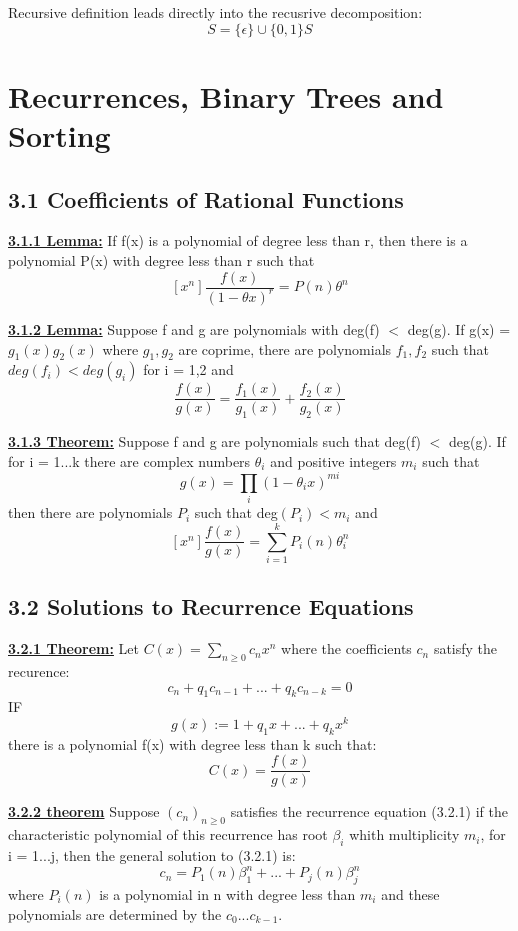 \documentclass[12pt]{article}
\newcommand{\myt}[1]{\textbf{\underline{#1}}}
\begin{document}
	Recursive definition leads directly into the recusrive decomposition:\\
	$$S = \{\epsilon\} \cup \{0,1\}S$$
	
	\section{Recurrences, Binary Trees and Sorting}
	\subsection*{3.1 Coefficients of Rational Functions}
	\myt{3.1.1 Lemma:} If f(x) is a polynomial of degree less than r, then there is a polynomial P(x) with degree less than r such that\\
	$$[x^n]\frac{f(x)}{(1-\theta x)^r} = P(n)\theta^n$$
	
	\myt{3.1.2 Lemma:} Suppose f and g are polynomials with deg(f) $<$ deg(g). If g(x) = $g_1(x)g_2(x)$ where $g_1, g_2$ are coprime, there are polynomials $f_1, f_2$ such that $deg(f_i) < deg(g_i)$ for i = 1,2 and \\
	$$\frac{f(x)}{g(x)} = \frac{f_1(x)}{g_1(x)} + \frac{f_2(x)}{g_2(x)}$$
	
	\myt{3.1.3 Theorem:} Suppose f and g are polynomials such that deg(f) $<$ deg(g). If for i = 1...k there are complex numbers $\theta_i$ and positive integers $m_i$ such that\\
	$$g(x) = \prod_{i}(1-\theta_ix)^{mi}$$
	then there are polynomials $P_i$ such that deg$(P_i) < m_i$ and \\
	$$[x^n]\frac{f(x)}{g(x)} = \sum_{i=1}^{k}P_i(n)\theta_i^n$$
	
	\subsection*{3.2 Solutions to Recurrence Equations}
	\myt{3.2.1 Theorem:} Let $C(x) = \sum_{n\geq 0}c_nx^n$ where the coefficients $c_n$ satisfy the recurence:\\
	$$c_n + q_1c_{n-1}+...+q_kc_{n-k} = 0$$
	IF
	$$g(x) := 1 + q_1x + ... + q_kx^k$$
	there is a polynomial f(x) with degree less than k such that:\\
	$$C(x) = \frac{f(x)}{g(x)}$$ 
	
	\myt{3.2.2 theorem} Suppose $(c_n)_{n\geq 0}$ satisfies the recurrence equation (3.2.1) if the characteristic polynomial of this recurrence has root $\beta_i$ whith multiplicity $m_i$, for i = 1...j, then the general solution to (3.2.1) is:\\
	$$c_n = P_1(n)\beta_1^n+...+P_j(n)\beta_j^n$$
	where $P_i(n)$ is a polynomial in n with degree less than $m_i$ and these polynomials are determined by the $c_0...c_{k-1}$.
	
\end{document}
